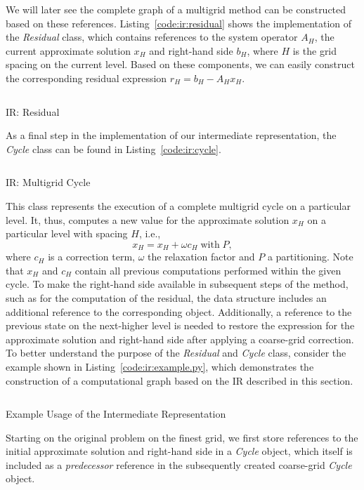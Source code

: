 We will later see the complete graph of a multigrid method can be constructed based on these references.
Listing~\ref{code:ir:residual} shows the implementation of the \emph{Residual} class, which contains references to the system operator $A_H$, the current approximate solution $x_H$ and right-hand side $b_H$, where $H$ is the grid spacing on the current level.
Based on these components, we can easily construct the corresponding residual expression $r_H = b_H - A_H x_H$.
\begin{listing}
	\inputminted{python}{evostencils/ir/residual.py}
	\caption{IR: Residual}
	\label{code:ir:residual}
\end{listing}
As a final step in the implementation of our intermediate representation, the \emph{Cycle} class can be found in Listing~\ref{code:ir:cycle}.
\begin{listing}
	\inputminted{python}{evostencils/ir/cycle.py}
	\caption{IR: Multigrid Cycle}
	\label{code:ir:cycle}
\end{listing}
This class represents the execution of a complete multigrid cycle on a particular level.
It, thus, computes a new value for the approximate solution $x_H$ on a particular level with spacing $H$, i.e.,
\begin{equation*}
	x_H = x_H + \omega c_H \; \text{with} \; P,
\end{equation*}
where $c_H$ is a correction term, $\omega$ the relaxation factor and $P$ a partitioning.
Note that $x_H$ and $c_H$ contain all previous computations performed within the given cycle.
To make the right-hand side available in subsequent steps of the method, such as for the computation of the residual, the data structure includes an additional reference to the corresponding object.
Additionally, a reference to the previous state on the next-higher level is needed to restore the expression for the approximate solution and right-hand side after applying a coarse-grid correction.
To better understand the purpose of the \emph{Residual} and \emph{Cycle} class, consider the example shown in Listing~\ref{code:ir:example.py}, which demonstrates the construction of a computational graph based on the IR described in this section.
\begin{listing}
	\inputminted{python}{evostencils/ir/example.py}
	\caption{Example Usage of the Intermediate Representation}
	\label{code:ir:example.py}
\end{listing}
Starting on the original problem on the finest grid, we first store references to the initial approximate solution and right-hand side in a \emph{Cycle} object, which itself is included as a \emph{predecessor} reference in the subsequently created coarse-grid \emph{Cycle} object.
